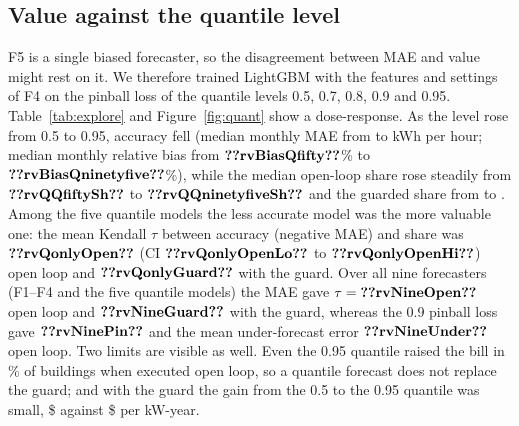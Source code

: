 \subsection{Value against the quantile level}\label{sec:explore-quant}
F5 is a single biased forecaster, so the disagreement between MAE and value might rest on it. We therefore trained LightGBM with the features and settings of F4 on the pinball loss of the quantile levels 0.5, 0.7, 0.8, 0.9 and 0.95. Table~\ref{tab:explore} and Figure~\ref{fig:quant} show a dose-response. As the level rose from 0.5 to 0.95, accuracy fell (median monthly MAE from  to  kWh per hour; median monthly relative bias from $\res{rvBiasQfifty}$\% to $\res{rvBiasQninetyfive}$\%), while the median open-loop share rose steadily from $\res{rvQQfiftySh}$ to $\res{rvQQninetyfiveSh}$ and the guarded share from  to . Among the five quantile models the less accurate model was the more valuable one: the mean Kendall $\tau$ between accuracy (negative MAE) and share was $\res{rvQonlyOpen}$ (CI $\res{rvQonlyOpenLo}$ to $\res{rvQonlyOpenHi}$) open loop and $\res{rvQonlyGuard}$ with the guard. Over all nine forecasters (F1--F4 and the five quantile models) the MAE gave $\tau=\res{rvNineOpen}$ open loop and $\res{rvNineGuard}$ with the guard, whereas the 0.9 pinball loss gave $\res{rvNinePin}$ and the mean under-forecast error $\res{rvNineUnder}$ open loop. Two limits are visible as well. Even the 0.95 quantile raised the bill in \% of buildings when executed open loop, so a quantile forecast does not replace the guard; and with the guard the gain from the 0.5 to the 0.95 quantile was small, \$ against \$ per kW-year.

